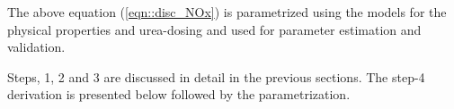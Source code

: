 The above equation (\ref{eqn::disc_NOx}) is parametrized using the models for the physical properties and
urea-dosing and used for parameter estimation and validation.

Steps, 1, 2 and 3 are discussed in detail in the previous sections. The step-4 derivation is presented below followed by the parametrization.







